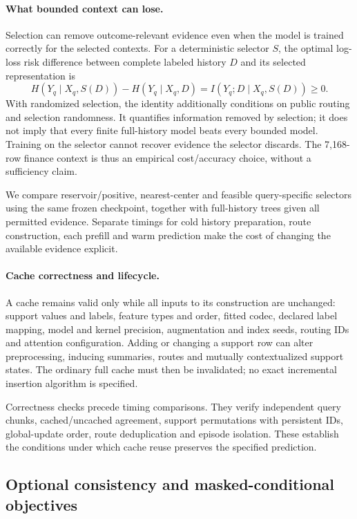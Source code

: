 \documentclass[11pt]{article}
\begin{document}
\paragraph{What bounded context can lose.}
Selection can remove outcome-relevant evidence even when the model is trained correctly for the selected contexts. For a deterministic selector $S$, the optimal log-loss risk difference between complete labeled history $D$ and its selected representation is
\[
H(Y_q\mid X_q,S(D))-H(Y_q\mid X_q,D)
=I(Y_q;D\mid X_q,S(D))\geq0.
\]
With randomized selection, the identity additionally conditions on public routing and selection randomness. It quantifies information removed by selection; it does not imply that every finite full-history model beats every bounded model. Training on the selector cannot recover evidence the selector discards. The 7,168-row finance context is thus an empirical cost/accuracy choice, without a sufficiency claim.

We compare reservoir/positive, nearest-center and feasible query-specific selectors using the same frozen checkpoint, together with full-history trees given all permitted evidence. Separate timings for cold history preparation, route construction, each prefill and warm prediction make the cost of changing the available evidence explicit.

\paragraph{Cache correctness and lifecycle.}
A cache remains valid only while all inputs to its construction are unchanged: support values and labels, feature types and order, fitted codec, declared label mapping, model and kernel precision, augmentation and index seeds, routing IDs and attention configuration. Adding or changing a support row can alter preprocessing, inducing summaries, routes and mutually contextualized support states. The ordinary full cache must then be invalidated; no exact incremental insertion algorithm is specified.

Correctness checks precede timing comparisons. They verify independent query chunks, cached/uncached agreement, support permutations with persistent IDs, global-update order, route deduplication and episode isolation. These establish the conditions under which cache reuse preserves the specified prediction.



\subsection{Optional consistency and masked-conditional objectives}
\label{sec:auxiliary-training}
\end{document}
